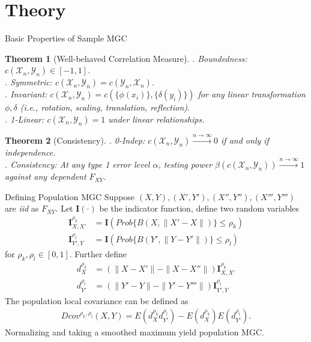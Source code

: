 \documentclass[mathserif,t]{beamer}
\newtheorem{thm}{Theorem}
\newtheorem*{defi*}{Definition}
\providecommand{\mb}[1]{\boldsymbol{#1}}
\newcommand{\Mgc}{MGC}
\newcommand{\mbx}{X}
\newcommand{\mby}{Y}
\begin{document}
\section{Theory}
\begin{frame}{Basic Properties of Sample \Mgc}
\begin{thm}[Well-behaved Correlation Measure]
. Boundedness: $c(\mathcal{X}_{n},\mathcal{Y}_{n}) \in [-1,1]$.\\
\pause
{}. Symmetric: $c(\mathcal{X}_{n},\mathcal{Y}_{n}) =c(\mathcal{Y}_{n},\mathcal{X}_{n})$.\\
\pause
{}. Invariant: $c(\mathcal{X}_{n},\mathcal{Y}_{n})=c(\{\phi(x_{i})\},\{\delta(y_{i})\})$ for any linear transformation $\phi,\delta$ (i.e., rotation, scaling, translation, reflection).\\
\pause
{}. 1-Linear: $c(\mathcal{X}_{n},\mathcal{Y}_{n})=1$ under linear relationships.\\
\end{thm}
\pause
\bigskip
\begin{thm}[Consistency]
. 0-Indep: $c(\mathcal{X}_{n},\mathcal{Y}_{n}) \stackrel{n \rightarrow \infty}{\rightarrow}0$ if and only if independence.\\
\pause
{}. Consistency: At any type 1 error level $\alpha$, testing power $\beta(c(\mathcal{X}_{n},\mathcal{Y}_{n})) \stackrel{n \rightarrow \infty}{\rightarrow} 1$ against any dependent $F_{\mbx \mby}$.\\
\end{thm}
\end{frame}

\begin{frame}{Defining Population \Mgc}
Suppose $(\mbx,\mby), (\mbx',\mby'), (\mbx'',\mby''), (\mbx''',\mby''')$ are \emph{iid} as $F_{XY}$. 
\pause
Let $\mb{I}(\cdot)$ be the indicator function, define two random variables
\begin{align*}
\mb{I}_{\mbx,\mbx'}^{\rho_{k}} &=\mb{I}(Prob\{B(\mbx,\|\mbx'-\mbx\|)\} \leq \rho_{k})  \\
\mb{I}_{\mby',\mby}^{\rho_{l}} &=\mb{I}(Prob\{B(\mby',\|\mby-\mby'\|)\} \leq \rho_{l})
\end{align*}
for $\rho_{k},\rho_{l} \in [0,1]$.
\pause
Further define
\begin{align*}
d^{\rho_{k}}_{\mbx} &=(\| \mbx-\mbx' \| - \|\mbx-\mbx''\|) \mb{I}_{\mbx,\mbx'}^{\rho_{k}} \\
d^{\rho_{l}}_{\mby'} &=(\| \mby'-\mby \| - \|\mby'-\mby'''\|) \mb{I}_{\mby',\mby}^{\rho_{l}}
\end{align*}
\pause
The population local covariance can be defined as
\begin{align*}
Dcov^{\rho_{k}, \rho_{l}}(\mbx,\mby) = E(d^{\rho_{k}}_{\mbx} d^{\rho_{l}}_{\mby'}) - E(d^{\rho_{k}}_{\mbx}) E(d^{\rho_{l}}_{\mby'}).
\end{align*}
\pause
Normalizing and taking a smoothed maximum yield population \Mgc.
\end{frame}
\end{document}
